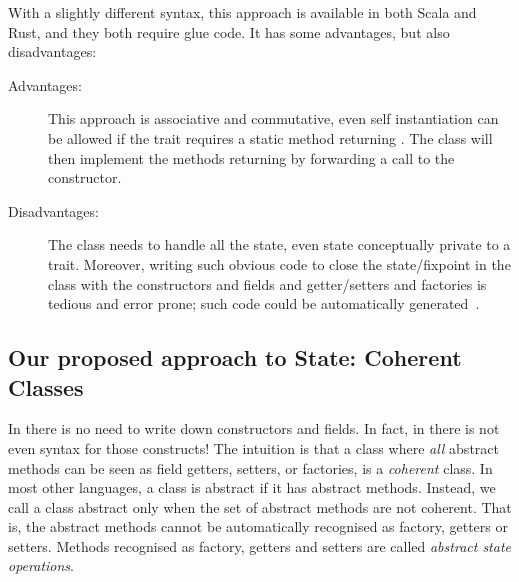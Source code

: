 With a slightly different syntax, this approach is available in both Scala and Rust, and they both require glue code.
It has some advantages, but also disadvantages: 

\begin{description}

\item[Advantages:] This approach is associative and commutative, even self instantiation
  can be allowed if the trait requires a static method
  returning \Q@This@. The class will then implement the methods returning \Q@This@
  by forwarding a call to the constructor.
  
\item[Disadvantages:]
The class needs to handle all the state, even state conceptually
   private to a trait. 
 Moreover, writing such obvious code to close
  the state/fixpoint in the class 
   with the constructors and fields and getter/setters and factories is tedious and error prone; such code could be automatically
   generated~\cite{wang2016classless}.
\end{description}


\subsection{Our proposed approach to State: Coherent Classes}

In \name there is no need to write down constructors and fields. In fact, in
\name there is not even syntax for those constructs!  The intuition is that
a class where \emph{all} abstract methods can be seen as field getters, setters, or factories,
is a \emph{coherent} class.  In most other languages, a class is
abstract if it has abstract methods.  Instead, we call a class
abstract only when the set of abstract methods are not coherent. That
is, the abstract methods cannot be automatically recognised
as factory, getters or setters. Methods recognised as factory, getters and setters are called
\emph{abstract state operations}.
  
